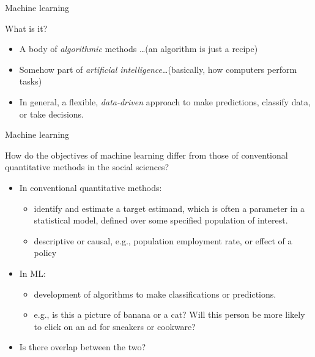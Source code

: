 \documentclass[xcolor={dvipsnames},handout]{beamer}
\begin{document}


\begin{frame}{Machine learning}

What is it?
\begin{itemize}
\item A body of \textit{algorithmic} methods \dots  (an algorithm is just a recipe)
\item Somehow part of \textit{artificial intelligence}\dots  (basically, how computers perform tasks)
\item In general, a flexible, \textit{data-driven} approach to make predictions, classify data, or take decisions.
\end{itemize}

\nocite{athey2019machine}

\end{frame}



\begin{frame}{Machine learning}

How do the objectives of machine learning differ from those of conventional quantitative methods in the social sciences?
\begin{itemize}
\item In conventional quantitative methods:
\begin{itemize}
\item identify and estimate a target estimand, which is often a parameter in a statistical model,  defined over some specified population of interest.
\item descriptive or causal, e.g., population employment rate, or effect of a policy
\end{itemize}
\item In ML:
\begin{itemize}
\item development of algorithms to make classifications or predictions.
\item e.g., is this a picture of banana or a cat?  Will this person be more likely to click on an ad for sneakers or cookware?
\end{itemize}
\item Is there overlap between the two?
\end{itemize}

\end{frame}
\end{document}
